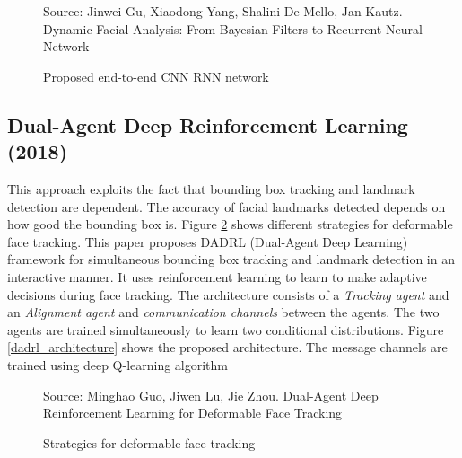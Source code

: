 \documentclass{llncs}
\begin{document}
\begin{figure}
%
{Source: Jinwei Gu, Xiaodong Yang, Shalini De Mello, Jan Kautz. Dynamic Facial Analysis: From Bayesian Filters to Recurrent Neural Network}
\caption{Proposed end-to-end CNN RNN network}
\label{cnn_rnn}
\end{figure}




\subsection{Dual-Agent Deep Reinforcement Learning (2018) \textcolor{green}{\cite{dadrl}}}

This approach exploits the fact that bounding box tracking and landmark detection are dependent. The accuracy of facial landmarks detected depends on how good the bounding box is.
Figure \textcolor{red}{\ref{deformable_face_tracking}} shows different strategies for deformable face tracking. This paper proposes DADRL (Dual-Agent Deep Learning) framework for simultaneous bounding box tracking and landmark detection in an interactive manner. It uses reinforcement learning to learn to make adaptive decisions during face tracking. The architecture consists of a \textit{Tracking agent} and an \textit{Alignment agent} and \textit{communication channels} between the agents. The two agents are trained simultaneously to learn two conditional distributions. Figure \textcolor{red}{\ref{dadrl_architecture}} shows the proposed architecture. The message channels are trained using deep Q-learning algorithm\\

\begin{figure}
%
{Source: Minghao Guo, Jiwen Lu, Jie Zhou. Dual-Agent Deep Reinforcement Learning for Deformable Face Tracking}
\caption{Strategies for deformable face tracking}
\label{deformable_face_tracking}
\end{figure}
\end{document}
